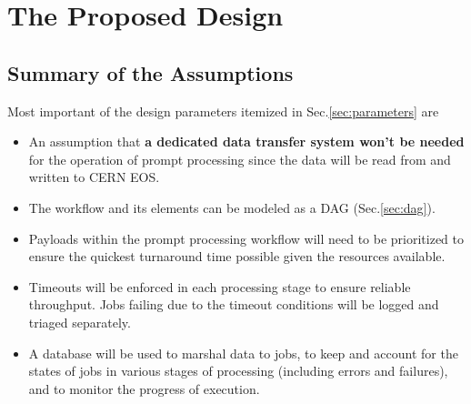 \documentclass[pdftex,12pt,letter]{article}
\begin{document}
\section{The Proposed Design}
\label{sec:design}
\subsection{Summary of the Assumptions}
Most important of the design parameters itemized in Sec.\ref{sec:parameters} are

\begin{itemize}

\item An assumption that \textbf{a dedicated data transfer system won't be needed} for the
operation of prompt processing since the data will be read from and written to CERN EOS.

\item The workflow and its elements can be modeled as a DAG (Sec.\ref{sec:dag}).

\item Payloads within the prompt processing workflow will need to be prioritized to ensure
the quickest turnaround time possible given the resources available.

\item Timeouts will be enforced in each processing stage to ensure reliable throughput. Jobs
failing due to the timeout conditions will be logged and triaged separately.

\item A database will be used to marshal data to jobs, to keep and account for the states
of jobs in various stages of processing (including errors and failures),
and to monitor the progress of execution.

\end{itemize}
\end{document}
